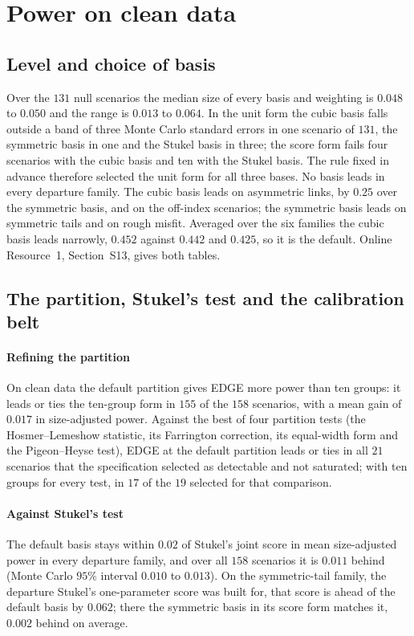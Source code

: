 \section{Power on clean data}\label{sec:power}

\subsection{Level and choice of basis}\label{sec:size}\label{sec:basis}

Over the $131$ null scenarios the median size of every basis and weighting is $0.048$ to $0.050$ and
the range is $0.013$ to $0.064$. In the unit form the cubic basis falls outside a band of three Monte
Carlo standard errors in one scenario of $131$, the symmetric basis in one and the Stukel basis in
three; the score form fails four scenarios with the cubic basis and ten with the Stukel basis. The rule
fixed in advance therefore selected the unit form for all three bases. No basis leads in every
departure family. The cubic basis leads on asymmetric links, by $0.25$ over the symmetric basis, and on
the off-index scenarios; the symmetric basis leads on symmetric tails and on rough misfit. Averaged over
the six families the cubic basis leads narrowly, $0.452$ against $0.442$ and $0.425$, so it is the
default. Online Resource~1, Section~S13, gives both tables.

\subsection{The partition, Stukel's test and the calibration belt}\label{sec:verdicts}

\paragraph{Refining the partition} On clean data the default partition gives EDGE more
power than ten groups: it leads or ties the ten-group form in $155$ of the $158$ scenarios, with a mean
gain of $0.017$ in size-adjusted power. Against the best of four partition tests (the Hosmer--Lemeshow
statistic, its Farrington correction, its equal-width form and the Pigeon--Heyse test), EDGE at the
default partition leads or ties in all $21$ scenarios that the specification selected as detectable
and not saturated; with ten groups for every test, in $17$ of the $19$ selected for that comparison.

\paragraph{Against Stukel's test} The default basis stays within $0.02$ of Stukel's joint score in
mean size-adjusted power in every departure family, and over all $158$ scenarios it is $0.011$ behind
(Monte Carlo $95\%$ interval $0.010$ to $0.013$). On the symmetric-tail family, the departure Stukel's
one-parameter score was built for, that score is ahead of the default basis by $0.062$; there the
symmetric basis in its score form matches it, $0.002$ behind on average.

